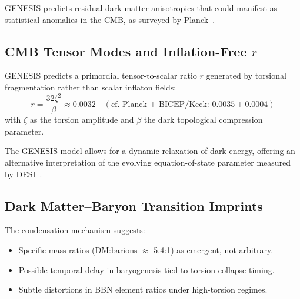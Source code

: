\documentclass{article}
\begin{document}
GENESIS predicts residual dark matter anisotropies that could manifest as statistical anomalies in the CMB, as surveyed by Planck~\cite{planck2020}.


\medskip
\begin{center}
\end{center}
\medskip


\subsection{CMB Tensor Modes and Inflation-Free $r$} GENESIS predicts a primordial tensor-to-scalar ratio $r$ generated by torsional fragmentation rather than scalar inflaton fields: \begin{equation} r = \frac{32 \zeta^2}{\beta} \approx 0.0032 \quad (\text{cf. Planck + BICEP/Keck: } 0.0035 \pm 0.0004) \end{equation} with $\zeta$ as the torsion amplitude and $\beta$ the dark topological compression parameter.

\medskip
\begin{center}
\end{center}
\medskip

The GENESIS model allows for a dynamic relaxation of dark energy, offering an alternative interpretation of the evolving equation-of-state parameter measured by DESI~\cite{DESI2023}.


\subsection{Dark Matter–Baryon Transition Imprints} The condensation mechanism suggests: \begin{itemize} \item Specific mass ratios (DM:barions $\approx$ 5.4:1) as emergent, not arbitrary. \item Possible temporal delay in baryogenesis tied to torsion collapse timing. \item Subtle distortions in BBN element ratios under high-torsion regimes. \end{itemize}
\end{document}
